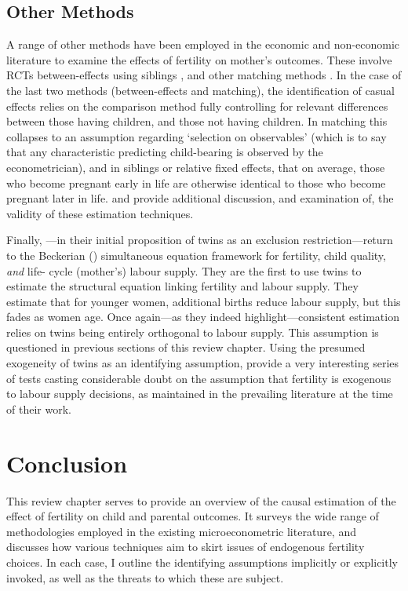 \subsection{Other Methods}
A range of other methods have been employed in the economic and non-economic
literature to examine the effects of fertility on mother's outcomes. These involve
RCTs \citep{DiCensoetal2002} between-effects using siblings \citep{Holmlund2005,
GeronimusKorenman1992,Ribar1999}, and other matching methods 
\citep{ChevalierViitanen2003,LevinePainter2003}.  In the case of the last two
methods (between-effects and matching), the identification of casual effects
relies on the comparison method fully controlling for relevant differences between
those having children, and those not having children.  In matching this collapses
to an assumption regarding `selection on observables' (which is to say that any
characteristic predicting child-bearing is observed by the econometrician), and in
siblings or relative fixed effects, that on average, those who become pregnant
early in life are otherwise identical to those who become pregnant later in life.
\citet{Ribar1999} and \citet{RosenzweigSchultz1985} provide additional discussion, 
and examination of, the validity of these estimation techniques.

Finally, \citet{RosenzweigWolpin1980b}---in their initial proposition of twins as
an exclusion restriction---return to the Beckerian (\citeyear{BeckerLewis1973})
simultaneous equation framework for fertility, child quality, \emph{and} life-%
cycle (mother's) labour supply.  They are the first to use twins to estimate
the structural equation linking fertility and labour supply.  They estimate
that for younger women, additional births reduce labour supply, but this fades
as women age.  Once again---as they indeed highlight---consistent estimation
relies on twins being entirely orthogonal to labour supply.  This assumption 
is questioned in previous sections of this review chapter. Using the presumed 
exogeneity of twins as an identifying assumption, \citet{RosenzweigWolpin1980b} 
provide a very interesting series of tests casting considerable doubt on the 
assumption that fertility is exogenous to labour supply decisions, as maintained 
in the prevailing literature at the time of their work.


\section{Conclusion}
This review chapter serves to provide an overview of the causal estimation of 
the effect of fertility on child and parental outcomes.  It surveys the wide 
range of methodologies employed in the existing microeconometric literature, and 
discusses how various techniques aim to skirt issues of endogenous fertility 
choices.  In each case, I outline the identifying assumptions implicitly or
explicitly invoked, as well as the threats to which these are subject.

